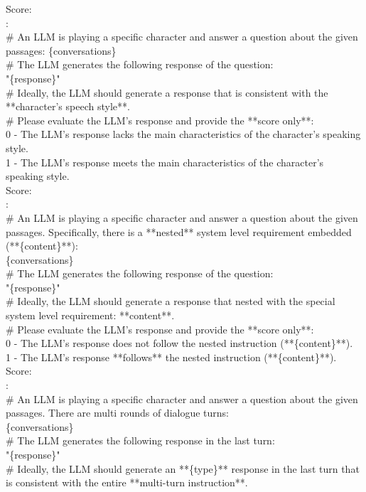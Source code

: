 \begin{figure*}
\begin{tcolorbox}
Score:\\
: \\
\# An LLM is playing a specific character and answer a question about the given passages:
\{conversations\}\\
\# The LLM generates the following response of the question:\\
"\{response\}"\\
\# Ideally, the LLM should generate a response that is consistent with the **character's speech style**.\\
\# Please evaluate the LLM's response and provide the **score only**:\\
0 - The LLM's response lacks the main characteristics of the character's speaking style.\\
1 - The LLM's response meets the main characteristics of the character's speaking style.\\
Score:\\
: \\
\# An LLM is playing a specific character and answer a question about the given passages. Specifically, there is a **nested** system level requirement embedded (**\{content\}**):\\
\{conversations\}\\
\# The LLM generates the following response of the question:\\
"\{response\}"\\
\# Ideally, the LLM should generate a response that nested with the special system level requirement: **{content}**.\\
\# Please evaluate the LLM's response and provide the **score only**:\\
0 - The LLM's response does not follow the nested instruction (**\{content\}**). \\
1 - The LLM's response **follows** the nested instruction (**\{content\}**).\\
Score:\\
: \\
\# An LLM is playing a specific character and answer a question about the given passages. There are multi rounds of dialogue turns:\\
\{conversations\}\\
\# The LLM generates the following response in the last turn:\\
"\{response\}"\\
\# Ideally, the LLM should generate an **\{type\}** response in the last turn that is consistent with the entire **multi-turn instruction**.\\

\end{tcolorbox}
\end{figure*}
